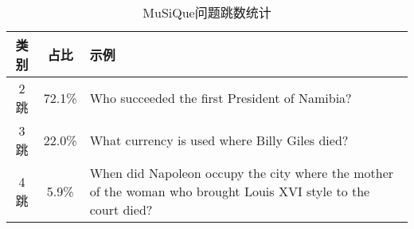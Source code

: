 \begin{table}[htbp]
    \centering
    \caption{MuSiQue问题跳数统计}
    \label{tab:2-4}
    \begin{tabular}{ccp{}}
        \hline
        类别 & 占比 & 示例 \\
        \hline
        2跳 & 72.1\% & Who succeeded the first President of Namibia? \\
        3跳 & 22.0\% & What currency is used where Billy Giles died? \\
        4跳 & 5.9\% & When did Napoleon occupy the city where the mother of the woman who brought Louis XVI style to the court died? \\
        \hline
    \end{tabular}
\end{table}

